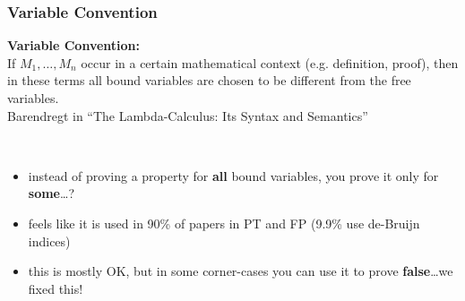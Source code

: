 \documentclass[dvipsnames,14pt,t]{beamer}
\begin{document}
\begin{frame}[c]
\frametitle{\Large Variable Convention}


\begin{center}
\begin{bubble}[10cm]
  \color{gray}  
  \small
  {\bf\mbox{}Variable Convention:}\\[1mm] 
  If $M_1,\ldots,M_n$ occur in a certain mathematical context
  (e.g. definition, proof), then in these terms all bound variables 
  are chosen to be different from the free variables.\\[2mm]
  
  \footnotesize\hfill Barendregt in ``The Lambda-Calculus: Its Syntax and Semantics''
\end{bubble}
\end{center}

\mbox{}\\[-8mm]
\begin{itemize}


\item instead of proving a property for \alert{\bf all} bound
variables, you prove it only for \alert{\bf some}\ldots?

\item feels like it is used in 90\% of papers in PT and FP
(9.9\% use de-Bruijn indices)

\item this is mostly OK, but in some corner-cases you can use it
to prove \alert{\bf false}\ldots we fixed this!
\end{itemize}

\end{frame}
\end{document}
